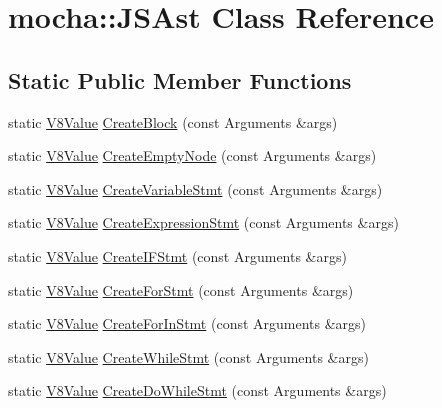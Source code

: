\hypertarget{classmocha_1_1_j_s_ast}{
\section{mocha::JSAst Class Reference}
\label{classmocha_1_1_j_s_ast}
}
\subsection*{Static Public Member Functions}
\begin{DoxyCompactItemize}
\item 
static \hyperlink{namespacemocha_a22eca0d76f439fca2a26cae77eb6ade4}{V8Value} \hyperlink{classmocha_1_1_j_s_ast_a0c0d9027b570cb1a863504aebb86dcff}{CreateBlock} (const Arguments \&args)
\item 
static \hyperlink{namespacemocha_a22eca0d76f439fca2a26cae77eb6ade4}{V8Value} \hyperlink{classmocha_1_1_j_s_ast_a970bd89b14f0ebfecd6454e7b42f0050}{CreateEmptyNode} (const Arguments \&args)
\item 
static \hyperlink{namespacemocha_a22eca0d76f439fca2a26cae77eb6ade4}{V8Value} \hyperlink{classmocha_1_1_j_s_ast_a5667c202a4228c92eb59b31af2ca0438}{CreateVariableStmt} (const Arguments \&args)
\item 
static \hyperlink{namespacemocha_a22eca0d76f439fca2a26cae77eb6ade4}{V8Value} \hyperlink{classmocha_1_1_j_s_ast_aca2c81569294f719b2a608d7f201382c}{CreateExpressionStmt} (const Arguments \&args)
\item 
static \hyperlink{namespacemocha_a22eca0d76f439fca2a26cae77eb6ade4}{V8Value} \hyperlink{classmocha_1_1_j_s_ast_a804d4b50e65d2c7e6080af0ce8e596a7}{CreateIFStmt} (const Arguments \&args)
\item 
static \hyperlink{namespacemocha_a22eca0d76f439fca2a26cae77eb6ade4}{V8Value} \hyperlink{classmocha_1_1_j_s_ast_ab795e322d7dbe76bcdbb4fb2d327f0a1}{CreateForStmt} (const Arguments \&args)
\item 
static \hyperlink{namespacemocha_a22eca0d76f439fca2a26cae77eb6ade4}{V8Value} \hyperlink{classmocha_1_1_j_s_ast_a3228b6759040c7d052809d32fe4f1220}{CreateForInStmt} (const Arguments \&args)
\item 
static \hyperlink{namespacemocha_a22eca0d76f439fca2a26cae77eb6ade4}{V8Value} \hyperlink{classmocha_1_1_j_s_ast_aee8e9df72c36c97362d64573f50cbe56}{CreateWhileStmt} (const Arguments \&args)
\item 
static \hyperlink{namespacemocha_a22eca0d76f439fca2a26cae77eb6ade4}{V8Value} \hyperlink{classmocha_1_1_j_s_ast_a15043b052ac79f62fd4d0ce0590b3d39}{CreateDoWhileStmt} (const Arguments \&args)

\end{DoxyCompactItemize}
